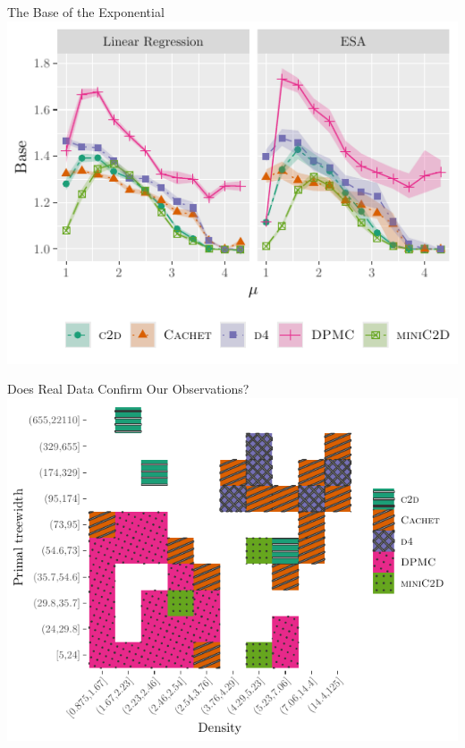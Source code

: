 \documentclass{beamer}
\begin{document}
\begin{frame}{The Base of the Exponential}
  \centering
  \includegraphics{linearbase2.pdf}
\end{frame}

\begin{frame}{Does Real Data Confirm Our Observations?}
  \centering
  \includegraphics{real}
\end{frame}
\end{document}
